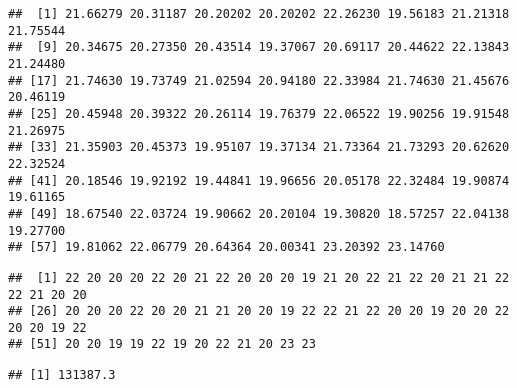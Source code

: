 \documentclass[
]{article}
\newenvironment{Shaded}{\begin{snugshade}}{\end{snugshade}}
\newcommand{\CommentTok}[1]{\textcolor[rgb]{0.56,0.35,0.01}{\textit{#1}}}
\newcommand{\KeywordTok}[1]{\textcolor[rgb]{0.13,0.29,0.53}{\textbf{#1}}}
\newcommand{\NormalTok}[1]{#1}
\newcommand{\OperatorTok}[1]{\textcolor[rgb]{0.81,0.36,0.00}{\textbf{#1}}}
\begin{document}
\begin{verbatim}
##  [1] 21.66279 20.31187 20.20202 20.20202 22.26230 19.56183 21.21318 21.75544
##  [9] 20.34675 20.27350 20.43514 19.37067 20.69117 20.44622 22.13843 21.24480
## [17] 21.74630 19.73749 21.02594 20.94180 22.33984 21.74630 21.45676 20.46119
## [25] 20.45948 20.39322 20.26114 19.76379 22.06522 19.90256 19.91548 21.26975
## [33] 21.35903 20.45373 19.95107 19.37134 21.73364 21.73293 20.62620 22.32524
## [41] 20.18546 19.92192 19.44841 19.96656 20.05178 22.32484 19.90874 19.61165
## [49] 18.67540 22.03724 19.90662 20.20104 19.30820 18.57257 22.04138 19.27700
## [57] 19.81062 22.06779 20.64364 20.00341 23.20392 23.14760
\end{verbatim}

\begin{Shaded}
\end{Shaded}

\begin{verbatim}
##  [1] 22 20 20 20 22 20 21 22 20 20 20 19 21 20 22 21 22 20 21 21 22 22 21 20 20
## [26] 20 20 20 22 20 20 21 21 20 20 19 22 22 21 22 20 20 19 20 20 22 20 20 19 22
## [51] 20 20 19 19 22 19 20 22 21 20 23 23
\end{verbatim}

\begin{Shaded}
\end{Shaded}

\begin{verbatim}
## [1] 131387.3
\end{verbatim}

\begin{Shaded}
\end{Shaded}
\end{document}
